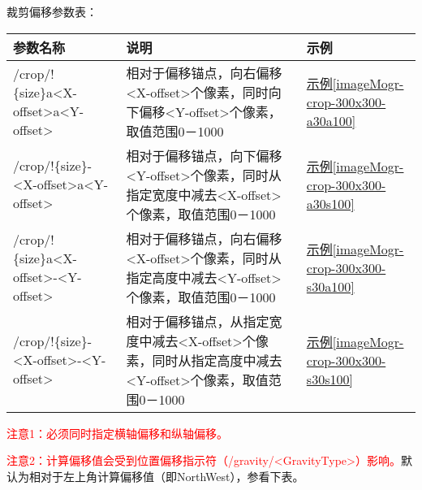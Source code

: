 \documentclass[11pt, oneside]{book}
\newcommand{\qpara}[1]{
\vspace{0.3em}
\noindent
#1\par
\vspace{0.3em}
}
\newcommand{\qtable}[1]{\footnotesize\vspace{0.5em}#1\vspace{0.5em}\normalsize}
\newcommand{\qsample}[1]{\hyperref[#1]{示例\ref*{#1}}}
\begin{document}
\clearpage

\qpara{裁剪偏移参数表：}
\qtable{
\label{crop-offset-spec}
\begin{tabular}[t]{|l|p{16em}|p{5em}|}
\hline
参数名称 & 说明 & 示例 \\
\hline
/crop/!\{size\}a\textless X-offset\textgreater a\textless Y-offset\textgreater & 相对于偏移锚点，向右偏移\textless X-offset\textgreater 个像素，同时向下偏移\textless Y-offset\textgreater 个像素，取值范围0－1000 & \qsample{imageMogr-crop-300x300-a30a100} \\
\hline
/crop/!\{size\}-\textless X-offset\textgreater a\textless Y-offset\textgreater & 相对于偏移锚点，向下偏移\textless Y-offset\textgreater 个像素，同时从指定宽度中减去\textless X-offset\textgreater 个像素，取值范围0－1000 & \qsample{imageMogr-crop-300x300-a30s100} \\
\hline
/crop/!\{size\}a\textless X-offset\textgreater -\textless Y-offset\textgreater & 相对于偏移锚点，向右偏移\textless X-offset\textgreater 个像素，同时从指定高度中减去\textless Y-offset\textgreater 个像素，取值范围0－1000 & \qsample{imageMogr-crop-300x300-s30a100} \\
\hline
/crop/!\{size\}-\textless X-offset\textgreater -\textless Y-offset\textgreater & 相对于偏移锚点，从指定宽度中减去\textless X-offset\textgreater 个像素，同时从指定高度中减去\textless Y-offset\textgreater 个像素，取值范围0－1000 & \qsample{imageMogr-crop-300x300-s30s100} \\
\hline
\end{tabular}
}

\qpara{\textcolor{red}{注意1：必须同时指定横轴偏移和纵轴偏移。}}
\qpara{\textcolor{red}{注意2：计算偏移值会受到位置偏移指示符（/gravity/\textless GravityType\textgreater）影响。}默认为相对于左上角计算偏移值（即NorthWest），参看下表。}
\end{document}
